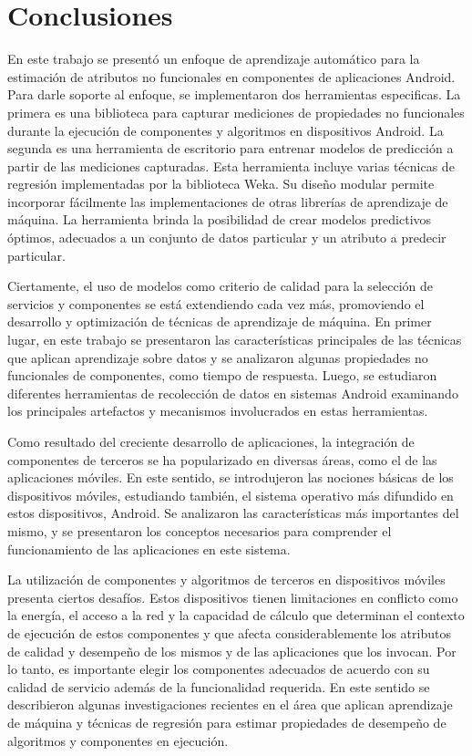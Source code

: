 
\chapter{Conclusiones\label{chap:Conclusiones}}



En este trabajo se presentó un enfoque de aprendizaje automático para
la estimación de atributos no funcionales en componentes de aplicaciones
Android. Para darle soporte al enfoque, se implementaron dos herramientas
especificas. La primera es una biblioteca para capturar mediciones
de propiedades no funcionales durante la ejecución de componentes
y algoritmos en dispositivos Android. La segunda es una herramienta
de escritorio para entrenar modelos de predicción a partir de las
mediciones capturadas. Esta herramienta incluye varias técnicas de
regresión implementadas por la biblioteca Weka. Su diseño modular
permite incorporar fácilmente las implementaciones de otras librerías
de aprendizaje de máquina. La herramienta brinda la posibilidad de
crear modelos predictivos óptimos, adecuados a un conjunto de datos
particular y un atributo a predecir particular.

Ciertamente, el uso de modelos como criterio de calidad para la selección
de servicios y componentes se está extendiendo cada vez más, promoviendo
el desarrollo y optimización de técnicas de aprendizaje de máquina.
En primer lugar, en este trabajo se presentaron las características
principales de las técnicas que aplican aprendizaje sobre datos y
se analizaron algunas propiedades no funcionales de componentes, como
tiempo de respuesta. Luego, se estudiaron diferentes herramientas
de recolección de datos en sistemas Android examinando los principales
artefactos y mecanismos involucrados en estas herramientas.

Como resultado del creciente desarrollo de aplicaciones, la integración
de componentes de terceros se ha popularizado en diversas áreas, como
el de las aplicaciones móviles. En este sentido, se introdujeron las
nociones básicas de los dispositivos móviles, estudiando también,
el sistema operativo más difundido en estos dispositivos, Android.
Se analizaron las características más importantes del mismo, y se
presentaron los conceptos necesarios para comprender el funcionamiento
de las aplicaciones en este sistema.

La utilización de componentes y algoritmos de terceros en dispositivos
móviles presenta ciertos desafíos. Estos dispositivos tienen limitaciones
en conflicto como la energía, el acceso a la red y la capacidad de
cálculo que determinan el contexto de ejecución de estos componentes
y que afecta considerablemente los atributos de calidad y desempeño
de los mismos y de las aplicaciones que los invocan. Por lo tanto,
es importante elegir los componentes adecuados de acuerdo con su calidad
de servicio además de la funcionalidad requerida. En este sentido
se describieron algunas investigaciones recientes en el área que aplican
aprendizaje de máquina y técnicas de regresión para estimar propiedades
de desempeño de algoritmos y componentes en ejecución.

